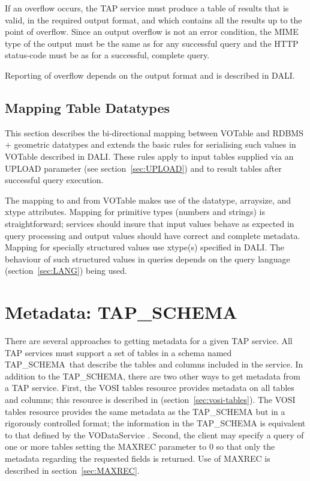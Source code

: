\documentclass[11pt,letter]{ivoa}
\newcommand{\tapschema}{TAP\_SCHEMA}
\newcommand{\tapschema}{\mbox{%
  \relsize{-0.5}TAP\discretionary{-}{}{\kern-2pt\_}SCHEMA}}
\begin{document}
If an overflow occurs, the TAP service must produce a table of results that is 
valid, in the required output format, and which contains all the results up to 
the point of overflow. Since an output overflow is not an error condition, the 
MIME type of the output must be the same as for any successful query and the 
HTTP status-code must be as for a successful, complete query.

Reporting of overflow depends on the output format and is described in DALI.

\subsection{Mapping Table Datatypes}
\label{sec:vot-rdbms}

This section describes the bi-directional mapping between VOTable and RDBMS + 
geometric datatypes and extends the basic rules for serialising such values in 
VOTable described in DALI. These rules apply to input tables 
supplied via an UPLOAD parameter (see section~\ref{sec:UPLOAD}) and to result tables after successful 
query execution.

The mapping to and from VOTable makes use of the datatype, arraysize, and xtype 
attributes. Mapping for primitive types (numbers and strings) is 
straightforward; services should insure that input values behave as 
expected in query processing and output values should have correct and complete 
metadata. Mapping for specially structured values use xtype(s) specified
in DALI. The behaviour of such structured values in queries depends 
on the query language (section~\ref{sec:LANG}) being used. 

\section{Metadata: TAP\kern-3pt\_SCHEMA}
\label{sec:tap-schema}

There are several approaches to getting metadata for a given TAP service. All 
TAP services must support a set of tables in a schema named 
\tapschema\ that describe the tables and columns included in the 
service. In addition to the \tapschema, there are two other ways 
to get metadata from a TAP service. First, the VOSI tables resource provides 
metadata on all tables and columns; this resource is described in 
(section~\ref{sec:vosi-tables}). The 
VOSI tables resource provides the same metadata as the \tapschema{}
but in a rigorously controlled format; the information in the 
\tapschema{} is equivalent to that defined by the  VODataService 
\citep{std:VODS11}. Second, the client may specify a query of one or more 
tables setting the 
MAXREC parameter to 0 so that only the metadata regarding the requested fields 
is returned. Use of MAXREC is described in section~\ref{sec:MAXREC}.
\end{document}

